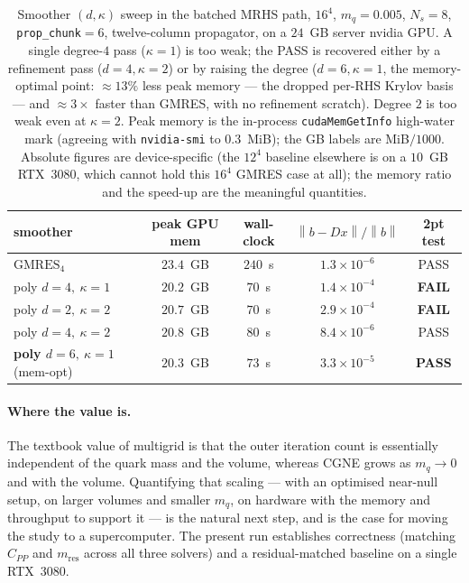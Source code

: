 \documentclass[12pt,a4paper]{article}
\newcommand{\Ddw}{D}
\newcommand{\norm}[1]{\left\lVert #1 \right\rVert}
\begin{document}
\begin{table}[h]
\centering
\begin{tabular}{lcccc}
\toprule
smoother & peak GPU mem & wall-clock & $\norm{b-\Ddw x}/\norm{b}$ & 2pt test \\
\midrule
$\mathrm{GMRES}_4$                        & $23.4$~GB & $240$~s & $1.3\times10^{-6}$ & PASS \\
poly $d{=}4,\ \kappa{=}1$                 & $20.2$~GB & $70$~s  & $1.4\times10^{-4}$ & \textbf{FAIL} \\
poly $d{=}2,\ \kappa{=}2$                 & $20.7$~GB & $70$~s  & $2.9\times10^{-4}$ & \textbf{FAIL} \\
poly $d{=}4,\ \kappa{=}2$                 & $20.8$~GB & $80$~s  & $8.4\times10^{-6}$ & PASS \\
\textbf{poly $d{=}6,\ \kappa{=}1$} (mem-opt) & $20.3$~GB & $73$~s  & $3.3\times10^{-5}$ & \textbf{PASS} \\
\bottomrule
\end{tabular}
\caption{Smoother $(d,\kappa)$ sweep in the batched MRHS path, $16^4$, $m_q=0.005$,
$N_s=8$, \texttt{prop\_chunk}$=6$, twelve-column propagator, on a $24$~GB server nvidia GPU. A
single degree-$4$ pass ($\kappa{=}1$) is too weak; the PASS is recovered either by
a refinement pass ($d{=}4,\kappa{=}2$) or by raising the degree ($d{=}6,\kappa{=}1$,
the memory-optimal point: ${\approx}13\%$ less peak memory --- the dropped per-RHS
Krylov basis --- and ${\approx}3\times$ faster than GMRES, with no refinement
scratch). Degree $2$ is too weak even at $\kappa{=}2$. Peak memory is the in-process
\texttt{cudaMemGetInfo} high-water mark (agreeing with \texttt{nvidia-smi} to
$0.3$~MiB); the GB labels are MiB$/1000$. Absolute figures are device-specific
(the $12^4$ baseline elsewhere is on a $10$~GB RTX~3080, which cannot hold this
$16^4$ GMRES case at all); the memory ratio and the speed-up are the meaningful
quantities.}
\label{tab:smoother-mem}
\end{table}

\paragraph{Where the value is.}
The textbook value of multigrid is that the outer iteration count is essentially
independent of the quark mass and the volume, whereas CGNE grows as $m_q\to0$ and
with the volume. Quantifying that scaling --- with an optimised near-null setup,
on larger volumes and smaller $m_q$, on hardware with the memory and throughput to
support it --- is the natural next step, and is the case for moving the study to a
supercomputer. The present run establishes correctness (matching $C_{PP}$ and
$m_{\mathrm{res}}$ across all three solvers) and a residual-matched baseline on a
single RTX~3080.
\end{document}
